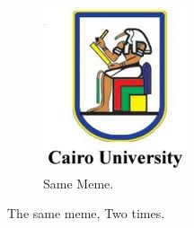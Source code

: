 \documentclass[a4paper,12pt]{report}
\begin{document}
\begin{figure}[h!]
\begin{subfigure}[b]{0.4\linewidth}
        \includegraphics[width=\linewidth]{slogan.jpg}
        \caption{Same Meme.}
    \end{subfigure}
    \caption{The same meme, Two times.}
    \label{fig:coffee}
    \end{figure}
\end{document}
